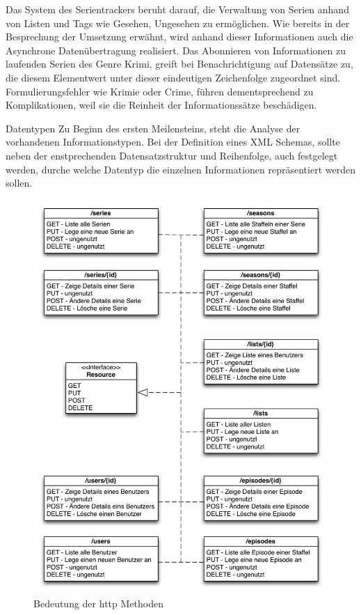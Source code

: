 \documentclass[a4paper]{article}
\begin{document}
Das System des Serientrackers beruht darauf, die Verwaltung von Serien anhand von Listen und Tags wie 
Gesehen, Ungesehen zu ermöglichen. Wie bereits in der Besprechung der Umsetzung erwähnt, wird anhand 
dieser Informationen auch die Asynchrone Datenübertragung realisiert.  
Das Abonnieren von Informationen zu laufenden Serien des Genre Krimi, greift bei Benachrichtigung auf 
Datensätze zu, die diesem Elementwert unter dieser eindeutigen Zeichenfolge zugeordnet sind. Formulierungsfehler 
wie Krimie oder Crime, führen dementsprechend zu Komplikationen, weil sie die Reinheit der Informationssätze beschädigen. 

Datentypen
Zu Beginn des ersten Meilensteins, steht die Analyse der vorhandenen Informationstypen. 
Bei der Definition eines XML Schemas, sollte neben der enstprechenden Datensatzstruktur und Reihenfolge, 
auch festgelegt werden, durche welche Datentyp die einzelnen Informationen repräsentiert werden sollen.


\begin{figure}
\includegraphics[width=1\textwidth]{images/bedeutunghttpmethoden.png}
\caption{Bedeutung der http Methoden}
\label{bedeutunghttpmethoden}
\end{figure}





\listoffigures
\end{document}
